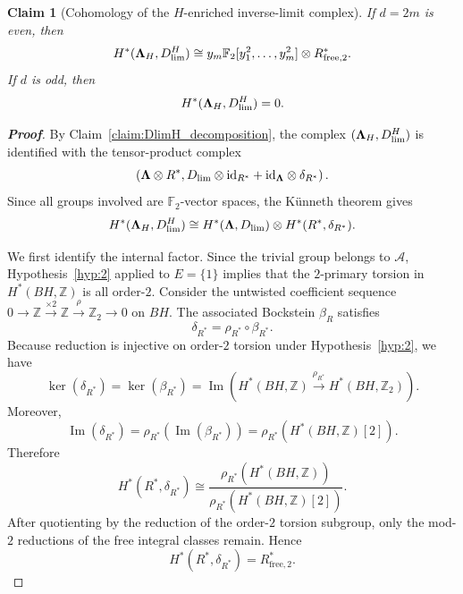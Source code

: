 \documentclass[aps,prx,reprint,superscriptaddress,twocolumn,amsmath,amssymb,amsfonts, nofootinbib]{revtex4-2}
\newcommand{\Z}{\mathbb{Z}}
\theoremstyle{apsstyle}
\newtheorem{claim}{Claim}
\begin{document}
\bigskip 

\begin{claim}[Cohomology of the $H$-enriched inverse-limit complex]
\label{claim:LambdaH_cohomology}
If $d=2m$ is even, then
\begin{equation}
H^{*}({\bf \Lambda}_{H},D_{\lim}^{H})
\cong
y_m\mathbb F_2[y_1^2,\dots,y_m^2]\otimes R_{\mathrm{free},2}^{*}.
\label{eq:LambdaH_cohomology_even}
\end{equation}
If $d$ is odd, then
\begin{equation}
H^{*}({\bf \Lambda}_{H},D_{\lim}^{H})=0.
\label{eq:LambdaH_cohomology_odd}
\end{equation}
\end{claim}

\begin{proof}[\textnormal{\textbf{Proof}}]
By Claim~\ref{claim:DlimH_decomposition}, the complex $({\bf \Lambda}_{H},D_{\lim}^{H})$ is identified with the tensor-product complex
\begin{equation}
\left( {\bf \Lambda}\otimes R^{*}, D_{\lim}\otimes \mathrm{id}_{R^{*}} + \mathrm{id}_{{\bf \Lambda}}\otimes \delta_{R^{*}} \right).
\end{equation}
Since all groups involved are $\mathbb F_2$-vector spaces, the K\"unneth theorem gives
\begin{equation}
H^{*}({\bf \Lambda}_{H},D_{\lim}^{H})
\cong H^{*}({\bf \Lambda},D_{\lim}) \otimes H^{*}(R^{*},\delta_{R^{*}}).
\label{eq:LambdaH_Kunneth}
\end{equation}

We first identify the internal factor. Since the trivial group belongs to $\mathcal A$, Hypothesis~\ref{hyp:2} applied to $E=\{1\}$ implies that the $2$-primary torsion in $H^{*}(BH,\Z)$ is all order-$2$. Consider the untwisted coefficient sequence $0\to \Z \xrightarrow{\times 2} \Z \xrightarrow{\rho} \Z_2 \to 0$
on $BH$. The associated Bockstein $\beta_R$ satisfies
\begin{equation}
\delta_{R^{*}}=\rho_{R^{*}}\circ\beta_{R^{*}}.
\end{equation}
Because reduction is injective on order-$2$ torsion under Hypothesis~\ref{hyp:2}, we have
\begin{equation}
\ker(\delta_{R^{*}}) = \ker(\beta_{R^{*}}) =
\operatorname{Im}\left(H^{*}(BH,\Z)\xrightarrow{\rho_{R^{*}}}H^{*}(BH,\Z_2)\right).
\end{equation}
Moreover,
\begin{equation}
\operatorname{Im}(\delta_{R^{*}}) = \rho_{R^{*}}\left(\operatorname{Im}(\beta_{R^{*}})\right)
= \rho_{R^{*}}\left(H^{*}(BH,\Z)[2]\right).
\end{equation}
Therefore
\begin{equation}
H^{*}(R^{*},\delta_{R^{*}})
\cong \frac{\rho_{R^{*}}\left(H^{*}(BH,\Z)\right)}{\rho_{R^{*}}\left(H^{*}(BH,\Z)[2]\right)}.
\end{equation}
After quotienting by the reduction of the order-$2$ torsion subgroup, only the mod-$2$ reductions of the free integral classes remain. Hence
\begin{equation}
H^{*}(R^{*},\delta_{R^{*}}) = R_{\mathrm{free},2}^{*}.
\label{eq:Rfree2_internal}
\end{equation}


\end{proof}
\end{document}
